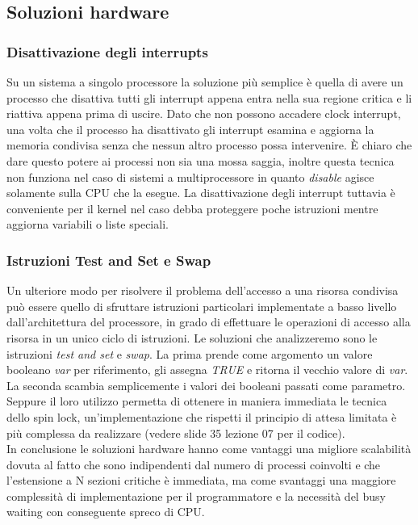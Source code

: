 \subsection{Soluzioni hardware}
\subsubsection{Disattivazione degli interrupts}
Su un sistema a singolo processore la soluzione più semplice è quella di avere un processo che disattiva tutti gli interrupt appena entra nella sua regione critica e li riattiva appena
prima di uscire. Dato che non possono accadere clock interrupt, una volta che il processo ha disattivato gli interrupt esamina e aggiorna la memoria condivisa senza che nessun altro
processo possa intervenire. È chiaro che dare questo potere ai processi non sia una mossa saggia, inoltre questa tecnica non funziona nel caso di sistemi a multiprocessore in quanto
\emph{disable} agisce solamente sulla CPU che la esegue. La disattivazione degli interrupt tuttavia è conveniente per il kernel nel caso debba proteggere poche istruzioni mentre aggiorna variabili o liste speciali.
\subsubsection{Istruzioni Test and Set e Swap}
Un ulteriore modo per risolvere il problema dell'accesso a una risorsa condivisa può essere quello di sfruttare istruzioni particolari implementate a basso livello dall'architettura del processore, in grado di effettuare le operazioni di accesso alla risorsa in un unico ciclo di istruzioni.
Le soluzioni che analizzeremo sono le istruzioni \emph{test and set} e \emph{swap}.
La prima prende come argomento un valore booleano \emph{var} per riferimento, gli assegna \emph{TRUE} e ritorna il vecchio valore di \emph{var}.
La seconda scambia semplicemente i valori dei booleani passati come parametro.
Seppure il loro utilizzo permetta di ottenere in maniera immediata le tecnica dello spin lock, un'implementazione che rispetti il principio di attesa limitata è più complessa da realizzare (vedere slide 35 lezione 07 per il codice). \\
In conclusione le soluzioni hardware hanno come vantaggi una migliore scalabilità dovuta al fatto che sono indipendenti dal numero di processi coinvolti e che l'estensione a N sezioni critiche è immediata, ma come svantaggi una maggiore complessità di implementazione per il programmatore e la necessità del busy waiting con conseguente spreco di CPU.



